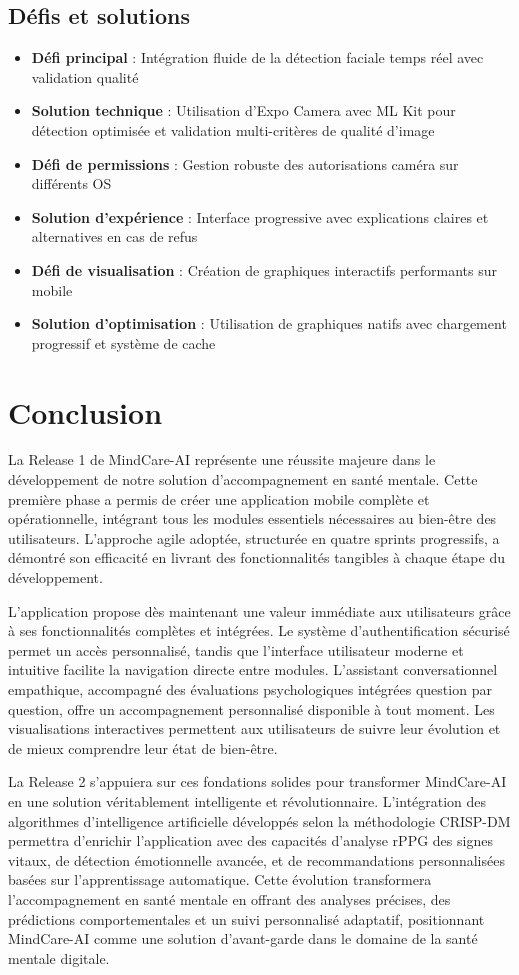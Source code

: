 \subsection{Défis et solutions}
\begin{itemize}
    \item \textbf{Défi principal} : Intégration fluide de la détection faciale temps réel avec validation qualité
    \item \textbf{Solution technique} : Utilisation d'Expo Camera avec ML Kit pour détection optimisée et validation multi-critères de qualité d'image
    \item \textbf{Défi de permissions} : Gestion robuste des autorisations caméra sur différents OS
    \item \textbf{Solution d'expérience} : Interface progressive avec explications claires et alternatives en cas de refus
    \item \textbf{Défi de visualisation} : Création de graphiques interactifs performants sur mobile
    \item \textbf{Solution d'optimisation} : Utilisation de graphiques natifs avec chargement progressif et système de cache
\end{itemize}

\section{Conclusion}
La Release 1 de MindCare-AI représente une réussite majeure dans le développement de notre solution d'accompagnement en santé mentale. Cette première phase a permis de créer une application mobile complète et opérationnelle, intégrant tous les modules essentiels nécessaires au bien-être des utilisateurs. L'approche agile adoptée, structurée en quatre sprints progressifs, a démontré son efficacité en livrant des fonctionnalités tangibles à chaque étape du développement.

L'application propose dès maintenant une valeur immédiate aux utilisateurs grâce à ses fonctionnalités complètes et intégrées. Le système d'authentification sécurisé permet un accès personnalisé, tandis que l'interface utilisateur moderne et intuitive facilite la navigation directe entre modules. L'assistant conversationnel empathique, accompagné des évaluations psychologiques intégrées question par question, offre un accompagnement personnalisé disponible à tout moment. Les visualisations interactives permettent aux utilisateurs de suivre leur évolution et de mieux comprendre leur état de bien-être.

La Release 2 s'appuiera sur ces fondations solides pour transformer MindCare-AI en une solution véritablement intelligente et révolutionnaire. L'intégration des algorithmes d'intelligence artificielle développés selon la méthodologie CRISP-DM permettra d'enrichir l'application avec des capacités d'analyse rPPG des signes vitaux, de détection émotionnelle avancée, et de recommandations personnalisées basées sur l'apprentissage automatique. Cette évolution transformera l'accompagnement en santé mentale en offrant des analyses précises, des prédictions comportementales et un suivi personnalisé adaptatif, positionnant MindCare-AI comme une solution d'avant-garde dans le domaine de la santé mentale digitale.